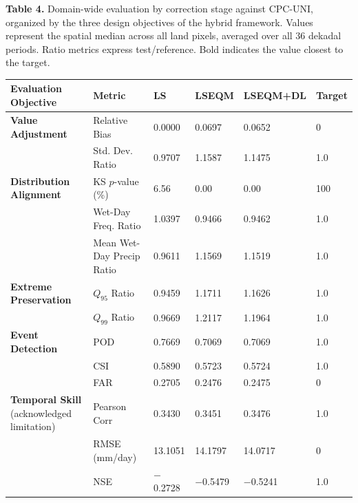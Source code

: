 \documentclass[11pt,a4paper]{article}
\begin{document}
\begin{landscape}
\textbf{Table 4.} Domain-wide evaluation by correction stage against
CPC-UNI, organized by the three design objectives of the hybrid
framework. Values represent the spatial median across all land pixels,
averaged over all 36 dekadal periods. Ratio metrics express
test/reference. Bold indicates the value closest to the target.

\begingroup\small
\begin{longtable}[]{@{}llllll@{}}
\toprule
Evaluation Objective & Metric & LS & LSEQM & LSEQM+DL & Target \\
\midrule
\endhead
\bottomrule
\endlastfoot
\textbf{Value Adjustment} & Relative Bias & 0.0000 & 0.0697 & 0.0652 &
0 \\
& Std. Dev. Ratio & 0.9707 & 1.1587 & 1.1475 & 1.0 \\
\textbf{Distribution Alignment} & KS \(p\)-value (\%) & 6.56 & 0.00 &
0.00 & 100 \\
& Wet-Day Freq. Ratio & 1.0397 & 0.9466 & 0.9462 & 1.0 \\
& Mean Wet-Day Precip Ratio & 0.9611 & 1.1569 & 1.1519 & 1.0 \\
\textbf{Extreme Preservation} & \(Q_{95}\) Ratio & 0.9459 & 1.1711 &
1.1626 & 1.0 \\
& \(Q_{99}\) Ratio & 0.9669 & 1.2117 & 1.1964 & 1.0 \\
\textbf{Event Detection} & POD & 0.7669 & 0.7069 & 0.7069 & 1.0 \\
& CSI & 0.5890 & 0.5723 & 0.5724 & 1.0 \\
& FAR & 0.2705 & 0.2476 & 0.2475 & 0 \\
\textbf{Temporal Skill} (acknowledged limitation) & Pearson Corr &
0.3430 & 0.3451 & 0.3476 & 1.0 \\
& RMSE (mm/day) & 13.1051 & 14.1797 & 14.0717 & 0 \\
& NSE & $-$0.2728 & $-$0.5479 & $-$0.5241 & 1.0 \\
\end{longtable}
\endgroup
\end{landscape}
\end{document}
